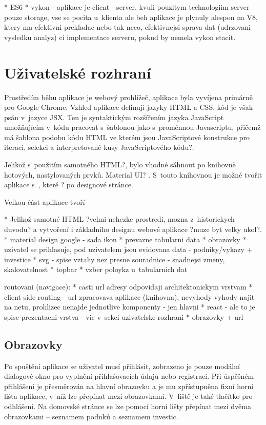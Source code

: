 * ES6
* vykon - aplikace je client - server, kvuli pouzitym technologiim server pouze storage, vse se pocita u~klienta ale beh aplikace je plynuly alespon na V8, ktery ma efektivni prekladac nebo tak neco, efektivnejsi sprava dat (udrzovani vysledku analyz) ci implementace serveru, pokud by nemela vykon stacit.




\section{Uživatelské rozhraní}

Prostředím běhu aplikace je webový prohlížeč, aplikace byla vyvíjena primárně pro Google Chrome. Vzhled aplikace definují jazyky HTML a CSS, kód je však psán v~jazyce JSX. Ten je syntaktickým rozšířením jazyka JavaScript umožňujícím v~kódu pracovat s~šablonou jako s~proměnnou Javascriptu, přičemž má šablona podobu kódu HTML ve kterém jsou JavaScriptové konstrukce pro iteraci, selekci a interpretované kusy JavaScriptového kódu?.

Jelikož s~použitím samotného HTML?, bylo vhodné sáhnout po knihovně hotových, nastylovaných prvků. Material UI? . S~touto knihovnou je možné tvořit aplikace s~, které ? po designové stránce.

Velkou část aplikace tvoří

* Jelikož samotné HTML ?velmi nehezke prostredi, mozna z~historickych duvodu? a vytvoření i základního designu webové aplikace ?muze byt velky ukol?. 
* material design google - sada ikon
* prevazne tabularni data
* obrazovky
* uzivatel se prihlasuje, pod uzivatelem jsou evidovana data - podniky/vykazy + investice
* svg - spise vztahy nez presne souradnice - snadnejsi zmeny, skalovatelnost
* topbar
* vzber poloykz u~tabularnich dat


routovani (navigace):
* casti url adresy odpovidaji architektonickym vrstvam
* client side routing - url zpracovava aplikace (knihovna), nevyhody vyhody najit na netu, prohlizec nenajde jednotlive komponenty - jen hlavni
* react - ale to je spise prezentacni vrstva - vic v~sekci uzivatelske rozhrani
* obrazovky + url

\subsection{Obrazovky}

Po spuštění aplikace se uživatel musí přihlásit, zobrazeno je pouze modální dialogové okno pro vyplnění přihlašovacích údajů nebo registraci. Při úspěšném přihlášení je přesměrován na hlavní obrazovku a je mu zpřístupněna fixní horní lišta aplikace, v~níž lze přepínat mezi obrazovkami. V~liště je také tlačítko pro odhlášení. Na domovské stránce se lze pomocí horní lišty přepínat mezi dvěma obrazovkami -- seznamem podnků a seznamem investic.

